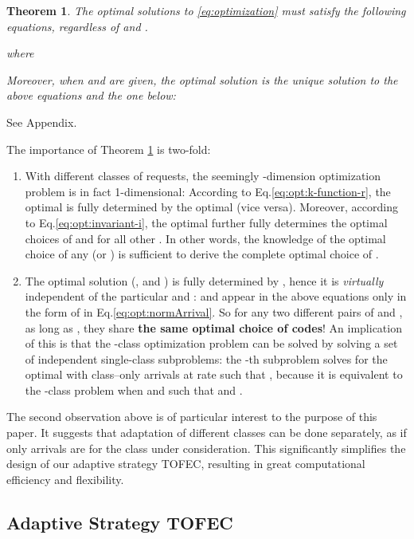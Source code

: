 \documentclass[journal]{IEEEtran}
\newcommand{\ourproposal}{TOFEC\xspace}
\newcommand{\ourscheme}{TOFEC\xspace}
\newtheorem{theorem}{\textbf{Theorem}}
\begin{document}
\begin{theorem}
\label{thm:optimal}
The optimal solutions to \eqref{eq:optimization} must satisfy the following equations, regardless of  and .


where

Moreover, when  and  are given, the optimal solution is the unique solution to the above equations and the one below:

\end{theorem}
\begin{IEEEproof} 
See Appendix.\\
\end{IEEEproof}
The importance of Theorem \ref{thm:optimal} is two-fold:
\begin{enumerate}
\item With  different classes of requests, the seemingly -dimension optimization problem is in fact 1-dimensional: According to Eq.\ref{eq:opt:k-function-r}, the optimal  is fully determined by the optimal  (vice versa). Moreover, according to Eq.\ref{eq:opt:invariant-i}, the optimal  further fully determines the optimal choices of  and  for all other . In other words, the knowledge of the optimal choice of any  (or ) is sufficient to derive the complete optimal choice of .

\item The optimal solution (,  and ) is fully determined by , hence it is {\em virtually} independent of the particular  and :  and  appear in the above equations only in the form of  in Eq.\ref{eq:opt:normArrival}. So for any two different pairs of  and , as long as , they share {\bf the same optimal choice of codes}! An implication of this is that the -class optimization problem can be solved by solving a set of  independent single-class subproblems: the -th subproblem solves for the optimal  with class--only arrivals at rate  such that , because it is equivalent to the -class problem when  and  such that  and . 
\end{enumerate}
The second observation above is of particular interest to the purpose of this paper. It suggests that adaptation of different classes can be done separately, as if only arrivals are for the class under consideration. This significantly simplifies the design of our adaptive strategy \ourscheme, resulting in great computational efficiency and flexibility.

\subsection{Adaptive Strategy \ourproposal}
\label{ssec:ana:adaptive}
\end{document}

